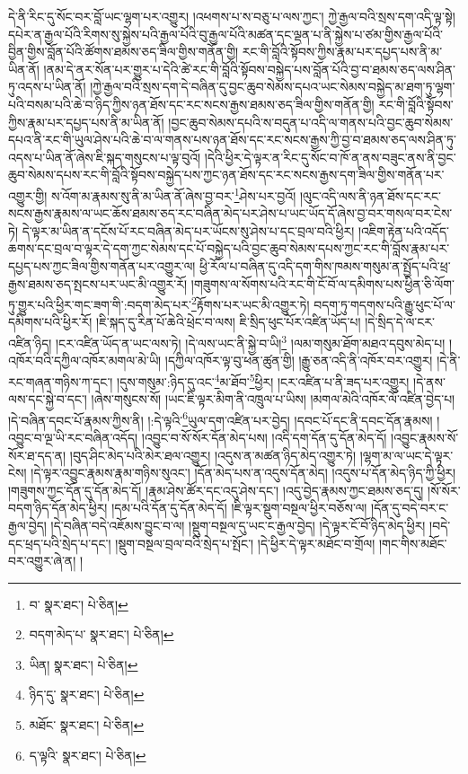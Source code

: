 དེ་ནི་རིང་དུ་སོང་བར་བློ་ཡང་ལྷག་པར་འགྱུར། །འཕགས་པ་ས་བཅུ་པ་ལས་ཀྱང་། ཀྱེ་རྒྱལ་བའི་སྲས་དག་འདི་ལྟ་སྟེ། དཔེར་ན་རྒྱལ་པོའི་རིགས་སུ་སྐྱེས་པའི་རྒྱལ་པོའི་བུ་རྒྱལ་པོའི་མཚན་དང་ལྡན་པ་ནི་སྐྱེས་པ་ཙམ་གྱིས་རྒྱལ་པོའི་བྱིན་གྱིས་བློན་པོའི་ཚོགས་ཐམས་ཅད་ཟིལ་གྱིས་གནོན་གྱི། རང་གི་བློའི་སྟོབས་ཀྱིས་རྣམ་པར་དཔྱད་པས་ནི་མ་ཡིན་ནོ། །ནམ་དེ་ནར་སོན་པར་གྱུར་པ་དེའི་ཚེ་རང་གི་བློའི་སྟོབས་བསྐྱེད་པས་བློན་པོའི་བྱ་བ་ཐམས་ཅད་ལས་ཤིན་ཏུ་འདས་པ་ཡིན་ནོ། །ཀྱེ་རྒྱལ་བའི་སྲས་དག་དེ་བཞིན་དུ་བྱང་ཆུབ་སེམས་དཔའ་ཡང་སེམས་བསྐྱེད་མ་ཐག་ཏུ་ལྷག་པའི་བསམ་པའི་ཆེ་བ་ཉིད་ཀྱིས་ཉན་ཐོས་དང་རང་སངས་རྒྱས་ཐམས་ཅད་ཟིལ་གྱིས་གནོན་གྱི། རང་གི་བློའི་སྟོབས་ཀྱིས་རྣམ་པར་དཔྱད་པས་ནི་མ་ཡིན་ནོ། །བྱང་ཆུབ་སེམས་དཔའི་ས་བདུན་པ་འདི་ལ་གནས་པའི་བྱང་ཆུབ་སེམས་དཔའ་ནི་རང་གི་ཡུལ་ཤེས་པའི་ཆེ་བ་ལ་གནས་པས་ཉན་ཐོས་དང་རང་སངས་རྒྱས་ཀྱི་བྱ་བ་ཐམས་ཅད་ལས་ཤིན་ཏུ་འདས་པ་ཡིན་ནོ་ཞེས་ཇི་སྐད་གསུངས་པ་ལྟ་བུའོ། །དེའི་ཕྱིར་དེ་ལྟར་ན་རིང་དུ་སོང་བ་ཁོ་ན་ནས་བཟུང་ནས་ནི་བྱང་ཆུབ་སེམས་དཔས་རང་གི་བློའི་སྟོབས་བསྐྱེད་པས་ཀྱང་ཉན་ཐོས་དང་རང་སངས་རྒྱས་དག་ཟིལ་གྱིས་གནོན་པར་འགྱུར་གྱི། ས་འོག་མ་རྣམས་སུ་ནི་མ་ཡིན་ནོ་ཞེས་བྱ་བར་\footnote{བ་  སྣར་ཐང་།  པེ་ཅིན། }ཤེས་པར་བྱའོ། །ལུང་འདི་ལས་ནི་ཉན་ཐོས་དང་རང་སངས་རྒྱས་རྣམས་ལ་ཡང་ཆོས་ཐམས་ཅད་རང་བཞིན་མེད་པར་ཤེས་པ་ཡང་ཡོད་དོ་ཞེས་བྱ་བར་གསལ་བར་ངེས་ཏེ། དེ་ལྟར་མ་ཡིན་ན་དངོས་པོ་རང་བཞིན་མེད་པར་ཡོངས་སུ་ཤེས་པ་དང་བྲལ་བའི་ཕྱིར། །འཇིག་རྟེན་པའི་འདོད་ཆགས་དང་བྲལ་བ་ལྟར་དེ་དག་ཀྱང་སེམས་དང་པོ་བསྐྱེད་པའི་བྱང་ཆུབ་སེམས་དཔས་ཀྱང་རང་གི་བློས་རྣམ་པར་དཔྱད་པས་ཀྱང་ཟིལ་གྱིས་གནོན་པར་འགྱུར་ལ། ཕྱི་རོལ་པ་བཞིན་དུ་འདི་དག་གིས་ཁམས་གསུམ་ན་སྤྱོད་པའི་ཕྲ་རྒྱས་ཐམས་ཅད་སྤངས་པར་ཡང་མི་འགྱུར་རོ། །གཟུགས་ལ་སོགས་པའི་རང་གི་ངོ་བོ་ལ་དམིགས་པས་ཕྱིན་ཅི་ལོག་ཏུ་གྱུར་པའི་ཕྱིར་གང་ཟག་གི་:བདག་མེད་པར་\footnote{བདག་མེད་པ་  སྣར་ཐང་།  པེ་ཅིན། }རྟོགས་པར་ཡང་མི་འགྱུར་ཏེ། བདག་ཏུ་གདགས་པའི་རྒྱུ་ཕུང་པོ་ལ་དམིགས་པའི་ཕྱིར་རོ། །ཇི་སྐད་དུ་རིན་པོ་ཆེའི་ཕྲེང་བ་ལས། ཇི་སྲིད་ཕུང་པོར་འཛིན་ཡོད་པ། །དེ་སྲིད་དེ་ལ་ངར་འཛིན་ཉིད། །ངར་འཛིན་ཡོད་ན་ཡང་ལས་ཏེ། །དེ་ལས་ཡང་ནི་སྐྱེ་བ་ཡི།\footnote{ཡིན།  སྣར་ཐང་།  པེ་ཅིན། } །ལམ་གསུམ་ཐོག་མཐའ་དབུས་མེད་པ། །འཁོར་བའི་དཀྱིལ་འཁོར་མགལ་མེ་ཡི། །དཀྱིལ་འཁོར་ལྟ་བུ་ཕན་ཚུན་གྱི། །རྒྱུ་ཅན་འདི་ནི་འཁོར་བར་འགྱུར། །དེ་ནི་རང་གཞན་གཉིས་ཀ་དང་། །དུས་གསུམ་:ཉིད་དུ་འང་\footnote{ཉིད་དུ་  སྣར་ཐང་།  པེ་ཅིན། }མ་ཐོབ་\footnote{མཐོང་  སྣར་ཐང་།  པེ་ཅིན། }ཕྱིར། །ངར་འཛིན་པ་ནི་ཟད་པར་འགྱུར། །དེ་ནས་ལས་དང་སྐྱེ་བ་དང་། །ཞེས་གསུངས་སོ། །ཡང་ཇི་ལྟར་མིག་ནི་འཁྲུལ་པ་ཡིས། །མགལ་མེའི་འཁོར་ལོ་འཛིན་བྱེད་པ། །དེ་བཞིན་དབང་པོ་རྣམས་ཀྱིས་ནི། །:དེ་ལྟའི་\footnote{ད་ལྟའི་  སྣར་ཐང་།  པེ་ཅིན། }ཡུལ་དག་འཛིན་པར་བྱེད། །དབང་པོ་དང་ནི་དབང་དོན་རྣམས། །འབྱུང་བ་ལྔ་ཡི་རང་བཞིན་འདོད། །འབྱུང་བ་སོ་སོར་དོན་མེད་པས། །འདི་དག་དོན་དུ་དོན་མེད་དོ། །འབྱུང་རྣམས་སོ་སོར་ཐ་དད་ན། །བུད་ཤིང་མེད་པའི་མེར་ཐལ་འགྱུར། །འདུས་ན་མཚན་ཉིད་མེད་འགྱུར་ཏེ། །ལྷག་མ་ལ་ཡང་དེ་ལྟར་ངེས། །དེ་ལྟར་འབྱུང་རྣམས་རྣམ་གཉིས་སུའང་། །དོན་མེད་པས་ན་འདུས་དོན་མེད། །འདུས་པ་དོན་མེད་ཉིད་ཀྱི་ཕྱིར། །གཟུགས་ཀྱང་དོན་དུ་དོན་མེད་དོ། །རྣམ་ཤེས་ཚོར་དང་འདུ་ཤེས་དང་། །འདུ་བྱེད་རྣམས་ཀྱང་ཐམས་ཅད་དུ། །སོ་སོར་བདག་ཉིད་དོན་མེད་ཕྱིར། །དམ་པའི་དོན་དུ་དོན་མེད་དོ། །ཇི་ལྟར་སྡུག་བསྔལ་ཕྱིར་བཅོས་ལ། །དོན་དུ་བདེ་བར་ང་རྒྱལ་བྱེད། །དེ་བཞིན་བདེ་འཇོམས་བྱུང་བ་ལ། །སྡུག་བསྔལ་དུ་ཡང་ང་རྒྱལ་བྱེད། །དེ་ལྟར་ངོ་བོ་ཉིད་མེད་ཕྱིར། །བདེ་དང་ཕྲད་པའི་སྲེད་པ་དང་། །སྡུག་བསྔལ་བྲལ་བའི་སྲེད་པ་སྤོང་། །དེ་ཕྱིར་དེ་ལྟར་མཐོང་བ་གྲོལ། །གང་གིས་མཐོང་བར་འགྱུར་ཞེ་ན། །
